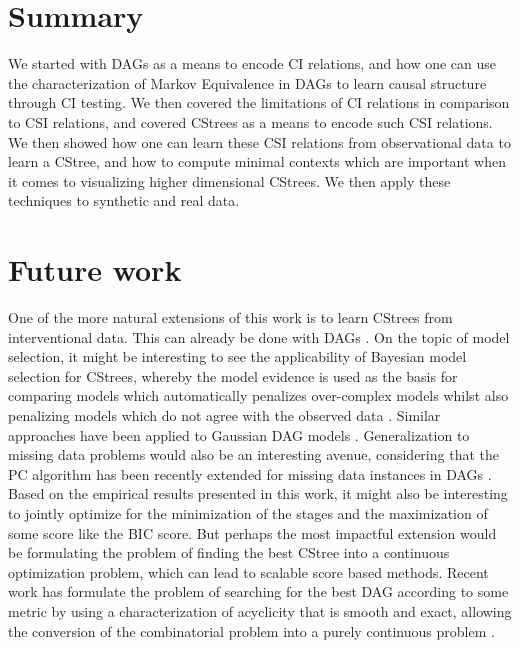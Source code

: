 \documentclass{tufte-book}
\begin{document}
\section{Summary}
\label{sec:orgcc6adc1}
We started with DAGs as a means to encode CI relations, and how one can use the characterization of Markov Equivalence in DAGs to learn causal structure through CI testing. We then covered the limitations of CI relations in comparison to CSI relations, and covered CStrees as a means to encode such CSI relations. We then showed how one can learn these CSI relations from observational data to learn a CStree, and how to compute minimal contexts which are important when it comes to visualizing higher dimensional CStrees. We then apply these techniques to synthetic and real data.


\section{Future work}
\label{sec:org36334c3}
One of the more natural extensions of this work is to learn CStrees from interventional data. This can already be done with DAGs \cite{yang-2018-charac-learn}. On the topic of model selection, it might be interesting to see the applicability of Bayesian model selection for CStrees, whereby the model evidence is used as the basis for comparing models which automatically penalizes over-complex models whilst also penalizing models which do not agree with the observed data \cite{mackay-1992-bayes-inter}. Similar approaches have been applied to Gaussian DAG models \cite{castelletti-2020-bayes-model}. Generalization to missing data problems would also be an interesting avenue, considering that the PC algorithm has been recently extended for missing data instances in DAGs \cite{tu-2019-causal-discov}. Based on the empirical results presented in this work, it might also be interesting to jointly optimize for the minimization of the stages and the maximization of some score like the BIC score. But perhaps the most impactful extension would be formulating the problem of finding the best CStree into a continuous optimization problem, which can lead to scalable score based methods. Recent work has formulate the problem of searching for the best DAG according to some metric by using a characterization of acyclicity that is smooth and exact, allowing the conversion of the combinatorial problem into a purely continuous problem \cite{zheng-2018-dags-no-tears}. 




 \newpage 
\end{document}

